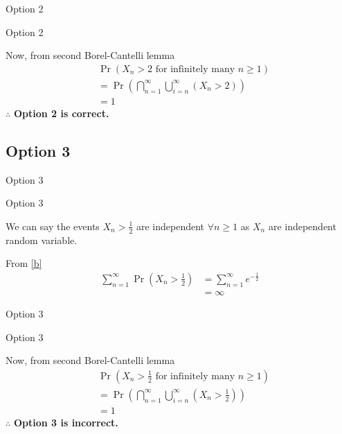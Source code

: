 \documentclass{beamer}
\providecommand{\pr}[1]{\ensuremath{\Pr\left(#1\right)}}
\providecommand{\pr}[1]{\ensuremath{\Pr\left(#1\right)}}
\providecommand{\brak}[1]{\ensuremath{\left(#1\right)}}
\theoremstyle{remark}
\numberwithin{equation}{subsection}
\begin{document}
\begin{frame}{Option 2}
\begin{block}{Option 2}

    Now, from second Borel-Cantelli lemma
    \begin{align}
        &\pr{X_n>2 \text{ for infinitely many }n\geq1}\nonumber\\
        &=\pr{\bigcap_{n=1}^{\infty}\bigcup_{i=n}^{\infty}\brak{ X_n>2}}\nonumber\\
        &=1\nonumber
    \end{align}
    $\therefore$ \textbf{Option 2 is correct.}

\end{block}
\end{frame}


\subsection{Option 3}
\begin{frame}{Option 3}
\begin{block}{Option 3}

We can say the events $X_n>\frac{1}{2}$ are independent $\forall n\geq 1$ as $X_n$ are independent random variable.
    
    From \eqref{b}
    \begin{align}
        \sum_{n=1}^{\infty}\pr{X_n > \frac{1}{2}} &= \sum_{n=1}^{\infty}e^{-\frac{1}{2}}\nonumber\\
                                            &= \infty\nonumber
    \end{align}
    
\end{block}
\end{frame}

\begin{frame}{Option 3}
\begin{block}{Option 3}

    Now, from second Borel-Cantelli lemma
    \begin{align}
        &\pr{X_n>\frac{1}{2} \text{ for infinitely many }n\geq1}\nonumber\\
        &=\pr{\bigcap_{n=1}^{\infty}\bigcup_{i=n}^{\infty}\brak{ X_n>\frac{1}{2}}}\nonumber\\
        &=1\nonumber
    \end{align}
    $\therefore$ \textbf{Option 3 is incorrect.}

\end{block}
\end{frame}
\end{document}
